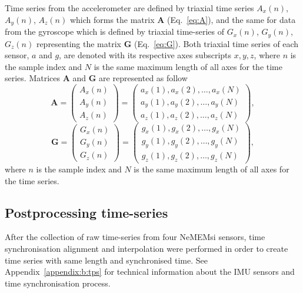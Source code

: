 Time series from the accelerometer are defined by triaxial time series 
$A_x(n)$, $A_y(n)$, $A_z(n)$ which forms the matrix $\boldsymbol{A}$ 
(Eq.~\ref{eq:A}), and the same for data from the gyroscope which is 
defined by triaxial time-series of $G_x(n)$, $G_y(n)$, $G_z(n)$ representing 
the matrix $\boldsymbol{G}$ (Eq.~\ref{eq:G}). Both triaxial time series of 
each sensor, $a$ and $g$, are denoted with its respective axes 
subscripts $x,y,z$, where $n$ is the sample index and $N$ is the same 
maximum length of all axes for the time series.
Matrices $\boldsymbol{A}$ and $\boldsymbol{G}$ are represented as follow
\begin{equation}\label{eq:A}
\boldsymbol{A} =
\begin{pmatrix}
  A_x(n) \\
  A_y(n) \\
  A_z(n)
\end{pmatrix}
=
\begin{pmatrix}
 a_x(1),a_x(2),\dots,a_x(N) \\
 a_y(1),a_y(2),\dots,a_y(N) \\
 a_z(1),a_z(2),\dots,a_z(N) 
\end{pmatrix},
\end{equation}
\begin{equation}\label{eq:G}
\boldsymbol{G} =
\begin{pmatrix}
 G_x(n) \\
 G_y(n) \\
 G_z(n)
\end{pmatrix}
=
\begin{pmatrix}
 g_x(1),g_x(2),\dots,g_x(N) \\
 g_y(1),g_y(2),\dots,g_y(N) \\
 g_z(1),g_z(2),\dots,g_z(N) 
\end{pmatrix},
\end{equation}
where $n$ is the sample index and $N$ is the same maximum length of all axes 
for the time series.

\subsection{Postprocessing time-series}
After the collection of raw time-series from four NeMEMsi sensors,
time synchronisation alignment and interpolation were performed 
in order to create time series with same length and synchronised time.
See Appendix~\ref{appendix:b:tps} for technical information 
about the IMU sensors and time synchronisation process.

